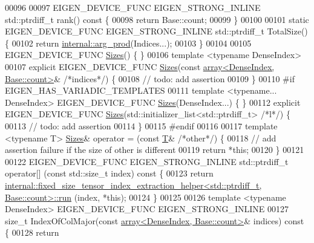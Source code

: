 \begin{DoxyCode}
00096 
00097   EIGEN\_DEVICE\_FUNC EIGEN\_STRONG\_INLINE std::ptrdiff\_t rank()\textcolor{keyword}{ const }\{
00098     \textcolor{keywordflow}{return} Base::count;
00099   \}
00100 
00101   \textcolor{keyword}{static} EIGEN\_DEVICE\_FUNC EIGEN\_STRONG\_INLINE std::ptrdiff\_t TotalSize() \{
00102     \textcolor{keywordflow}{return} \hyperlink{struct_eigen_1_1internal_1_1arg__prod}{internal::arg\_prod}(Indices...);
00103   \}
00104 
00105   EIGEN\_DEVICE\_FUNC \hyperlink{struct_eigen_1_1_sizes}{Sizes}() \{ \}
00106   \textcolor{keyword}{template} <\textcolor{keyword}{typename} DenseIndex>
00107   \textcolor{keyword}{explicit} EIGEN\_DEVICE\_FUNC \hyperlink{struct_eigen_1_1_sizes}{Sizes}(\textcolor{keyword}{const} \hyperlink{class_eigen_1_1array}{array<DenseIndex, Base::count>}&
       \textcolor{comment}{/*indices*/}) \{
00108     \textcolor{comment}{// todo: add assertion}
00109   \}
00110 \textcolor{preprocessor}{#if EIGEN\_HAS\_VARIADIC\_TEMPLATES}
00111   \textcolor{keyword}{template} <\textcolor{keyword}{typename}... DenseIndex> EIGEN\_DEVICE\_FUNC \hyperlink{struct_eigen_1_1_sizes}{Sizes}(DenseIndex...) \{ \}
00112   \textcolor{keyword}{explicit} EIGEN\_DEVICE\_FUNC \hyperlink{struct_eigen_1_1_sizes}{Sizes}(std::initializer\_list<std::ptrdiff\_t> \textcolor{comment}{/*l*/}) \{
00113     \textcolor{comment}{// todo: add assertion}
00114   \}
00115 \textcolor{preprocessor}{#endif}
00116 
00117   \textcolor{keyword}{template} <\textcolor{keyword}{typename} T> \hyperlink{struct_eigen_1_1_sizes}{Sizes}& operator = (\textcolor{keyword}{const} \hyperlink{group___sparse_core___module}{T}& \textcolor{comment}{/*other*/}) \{
00118     \textcolor{comment}{// add assertion failure if the size of other is different}
00119     \textcolor{keywordflow}{return} *\textcolor{keyword}{this};
00120   \}
00121 
00122   EIGEN\_DEVICE\_FUNC EIGEN\_STRONG\_INLINE std::ptrdiff\_t operator[] (\textcolor{keyword}{const} std::size\_t index)\textcolor{keyword}{ const }\{
00123     \textcolor{keywordflow}{return} 
      \hyperlink{struct_eigen_1_1internal_1_1fixed__size__tensor__index__extraction__helper}{internal::fixed\_size\_tensor\_index\_extraction\_helper<std::ptrdiff\_t, Base::count>::run}
      (index, *\textcolor{keyword}{this});
00124   \}
00125 
00126   \textcolor{keyword}{template} <\textcolor{keyword}{typename} DenseIndex> EIGEN\_DEVICE\_FUNC EIGEN\_STRONG\_INLINE
00127   \textcolor{keywordtype}{size\_t} IndexOfColMajor(\textcolor{keyword}{const} \hyperlink{class_eigen_1_1array}{array<DenseIndex, Base::count>}& indices)\textcolor{keyword}{ const
       }\{
00128     \textcolor{keywordflow}{return} 

\end{DoxyCode}
